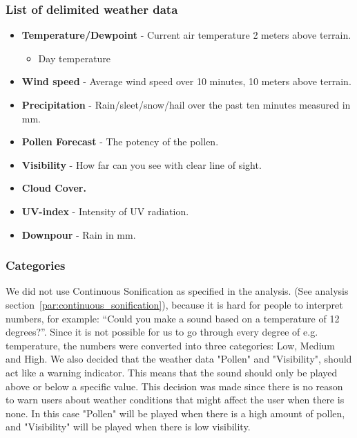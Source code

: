 \subsubsection*{List of delimited weather data} %
\label{ssub:list_of_delimited_weather_data}

\begin{itemize}
     \item \textbf{Temperature/Dewpoint} - Current air temperature 2 meters above terrain.
     \begin{itemize}
         \item Day temperature
     \end{itemize}
     \item \textbf{Wind speed} - Average wind speed over 10 minutes, 10 meters above terrain.
     \item \textbf{Precipitation} - Rain/sleet/snow/hail over the past ten minutes measured in mm.
     \item \textbf{Pollen Forecast} - The potency of the pollen.
     \item \textbf{Visibility} - How far can you see with clear line of sight.
     \item \textbf{Cloud Cover.}
     \item \textbf{UV-index} - Intensity of UV radiation.
     \item \textbf{Downpour} - Rain in mm.
 \end{itemize}



\subsubsection{Categories} %
\label{ssub:categories}


We did not use Continuous Sonification as specified in the analysis. (See analysis section~\ref{par:continuous_sonification}), because it is hard for people to interpret numbers, for example: \enquote{Could you make a sound based on a temperature of 12 degrees?}. 
Since it is not possible for us to go through every degree of e.g. temperature, the numbers were converted into three categories: Low, Medium and High. 
We also decided that the weather data "Pollen" and "Visibility", should act like a warning indicator. 
This means that the sound should only be played above or below a specific value.
This decision was made since there is no reason to warn users about weather conditions that might affect the user when there is none. 
In this case "Pollen" will be played when there is a high amount of pollen, and "Visibility" will be played when there is low visibility.

